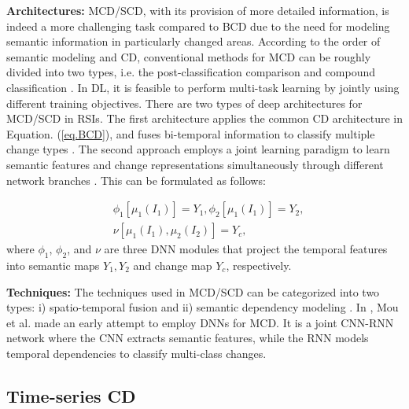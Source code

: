 \textbf{Architectures:} MCD/SCD, with its provision of more detailed information, is indeed a more challenging task compared to BCD due to the need for modeling semantic information in particularly changed areas. According to the order of semantic modeling and CD, conventional methods for MCD can be roughly divided into two types, i.e. the post-classification comparison \cite{singh1990digital} and compound classification \cite{bruzzone1997iterative, wu2017post}. In DL, it is feasible to perform multi-task learning by jointly using different training objectives. There are two types of deep architectures for MCD/SCD in RSIs. The first architecture applies the common CD architecture in Equation. (\ref{eq.BCD}), and fuses bi-temporal information to classify multiple change types \cite{mou2018learning, zhu2022landuse}. The second approach employs a joint learning paradigm to learn semantic features and change representations simultaneously through different network branches \cite{daudt2019multitask, yang2021asymmetric}. This can be formulated as follows:

\begin{equation}
    \begin{aligned}
    & \phi_1 [\mu_1(I_1)] = Y_1, \phi_2 [\mu_1(I_1)] = Y_2,\\
    & \nu [\mu_1(I_1), \mu_2(I_2)] = Y_c,
\end{aligned}
\end{equation}
where $\phi_1$, $\phi_2$, and $\nu$ are three DNN modules that project the temporal features into semantic maps $Y_1, Y_2$ and change map $Y_c$, respectively.

\textbf{Techniques:} The techniques used in MCD/SCD can be categorized into two types: i) spatio-temporal fusion \cite{zhu2022landuse, zheng2022changemask} and ii) semantic dependency modeling \cite{ding2024scannet}.
In \cite{mou2018learning}, Mou et al. made an early attempt to employ DNNs for MCD. It is a joint CNN-RNN network where the CNN extracts semantic features, while the RNN models temporal dependencies to classify multi-class changes.


\subsection{Time-series CD}

